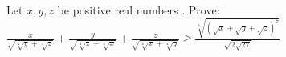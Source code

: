 Let $x,y,z$ be positive real numbers . Prove:$\frac{x}{\sqrt{\sqrt[4]{y}+\sqrt[4]{z}}}+\frac{y}{\sqrt{\sqrt[4]{z}+\sqrt[4]{x}}}+\frac{z}{\sqrt{\sqrt[4]{x}+\sqrt[4]{y}}}\geq \frac{\sqrt[4]{(\sqrt{x}+\sqrt{y}+\sqrt{z})^7}}{\sqrt{2\sqrt{27}}}$